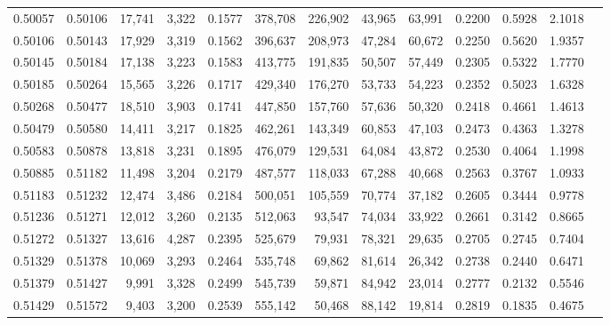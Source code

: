 \begin{tabular}{rrrrrrrrrrrrr}
0.50057 & 0.50106 & 17,741 & 3,322 &                                     0.1577 & 378,708 & 226,902 &  43,965 &  63,991 & 0.2200 & 0.5928 & 2.1018 \\
0.50106 & 0.50143 & 17,929 & 3,319 &                                     0.1562 & 396,637 & 208,973 &  47,284 &  60,672 & 0.2250 & 0.5620 & 1.9357 \\
0.50145 & 0.50184 & 17,138 & 3,223 &                                     0.1583 & 413,775 & 191,835 &  50,507 &  57,449 & 0.2305 & 0.5322 & 1.7770 \\
0.50185 & 0.50264 & 15,565 & 3,226 &                                     0.1717 & 429,340 & 176,270 &  53,733 &  54,223 & 0.2352 & 0.5023 & 1.6328 \\
0.50268 & 0.50477 & 18,510 & 3,903 &                                     0.1741 & 447,850 & 157,760 &  57,636 &  50,320 & 0.2418 & 0.4661 & 1.4613 \\
0.50479 & 0.50580 & 14,411 & 3,217 &                                     0.1825 & 462,261 & 143,349 &  60,853 &  47,103 & 0.2473 & 0.4363 & 1.3278 \\
0.50583 & 0.50878 & 13,818 & 3,231 &                                     0.1895 & 476,079 & 129,531 &  64,084 &  43,872 & 0.2530 & 0.4064 & 1.1998 \\
0.50885 & 0.51182 & 11,498 & 3,204 &                                     0.2179 & 487,577 & 118,033 &  67,288 &  40,668 & 0.2563 & 0.3767 & 1.0933 \\
0.51183 & 0.51232 & 12,474 & 3,486 &                                     0.2184 & 500,051 & 105,559 &  70,774 &  37,182 & 0.2605 & 0.3444 & 0.9778 \\
0.51236 & 0.51271 & 12,012 & 3,260 &                                     0.2135 & 512,063 &  93,547 &  74,034 &  33,922 & 0.2661 & 0.3142 & 0.8665 \\
0.51272 & 0.51327 & 13,616 & 4,287 &                                     0.2395 & 525,679 &  79,931 &  78,321 &  29,635 & 0.2705 & 0.2745 & 0.7404 \\
0.51329 & 0.51378 & 10,069 & 3,293 &                                     0.2464 & 535,748 &  69,862 &  81,614 &  26,342 & 0.2738 & 0.2440 & 0.6471 \\
0.51379 & 0.51427 &  9,991 & 3,328 &                                     0.2499 & 545,739 &  59,871 &  84,942 &  23,014 & 0.2777 & 0.2132 & 0.5546 \\
0.51429 & 0.51572 &  9,403 & 3,200 &                                     0.2539 & 555,142 &  50,468 &  88,142 &  19,814 & 0.2819 & 0.1835 & 0.4675 \\

\end{tabular}
